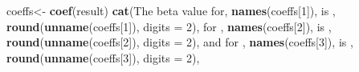 \documentclass[
]{book}
\newenvironment{Shaded}{\begin{snugshade}}{\end{snugshade}}
\newcommand{\AttributeTok}[1]{\textcolor[rgb]{0.13,0.29,0.53}{#1}}
\newcommand{\DecValTok}[1]{\textcolor[rgb]{0.00,0.00,0.81}{#1}}
\newcommand{\FunctionTok}[1]{\textcolor[rgb]{0.13,0.29,0.53}{\textbf{#1}}}
\newcommand{\NormalTok}[1]{#1}
\newcommand{\OtherTok}[1]{\textcolor[rgb]{0.56,0.35,0.01}{#1}}
\newcommand{\StringTok}[1]{\textcolor[rgb]{0.31,0.60,0.02}{#1}}
\begin{document}
\begin{Shaded}
\begin{Highlighting}[]
\NormalTok{coeffs}\OtherTok{\textless{}{-}} \FunctionTok{coef}\NormalTok{(result)}
\FunctionTok{cat}\NormalTok{(}\StringTok{\textquotesingle{}The beta value for\textquotesingle{}}\NormalTok{, }\FunctionTok{names}\NormalTok{(coeffs[}\DecValTok{1}\NormalTok{]), }\StringTok{\textquotesingle{} is \textquotesingle{}}\NormalTok{, }\FunctionTok{round}\NormalTok{(}\FunctionTok{unname}\NormalTok{(coeffs[}\DecValTok{1}\NormalTok{]), }\AttributeTok{digits =} \DecValTok{2}\NormalTok{), }\StringTok{\textquotesingle{} for \textquotesingle{}}\NormalTok{, }\FunctionTok{names}\NormalTok{(coeffs[}\DecValTok{2}\NormalTok{]), }\StringTok{\textquotesingle{} is \textquotesingle{}}\NormalTok{, }\FunctionTok{round}\NormalTok{(}\FunctionTok{unname}\NormalTok{(coeffs[}\DecValTok{2}\NormalTok{]), }\AttributeTok{digits =} \DecValTok{2}\NormalTok{), }\StringTok{\textquotesingle{} and for \textquotesingle{}}\NormalTok{, }\FunctionTok{names}\NormalTok{(coeffs[}\DecValTok{3}\NormalTok{]), }\StringTok{\textquotesingle{} is \textquotesingle{}}\NormalTok{, }\FunctionTok{round}\NormalTok{(}\FunctionTok{unname}\NormalTok{(coeffs[}\DecValTok{3}\NormalTok{]), }\AttributeTok{digits =} \DecValTok{2}\NormalTok{),}
    

\end{Highlighting}
\end{Shaded}
\end{document}
